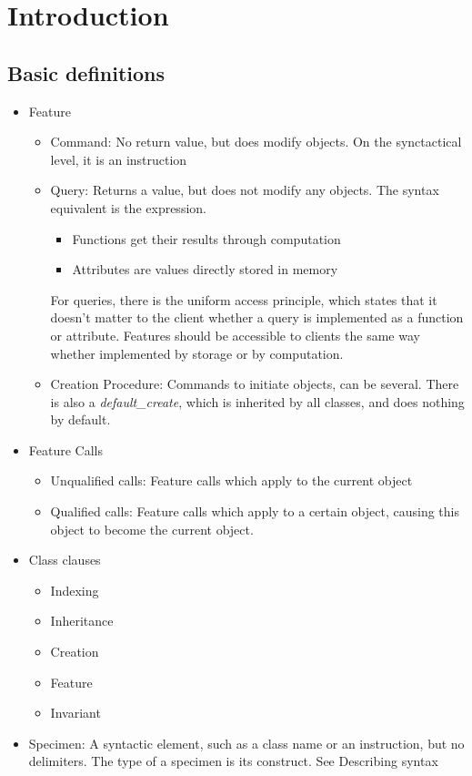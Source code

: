 \documentclass[a4paper]{article}
\begin{document}
\section{Introduction}
\subsection{Basic definitions}
\begin{itemize}
\item Feature
\begin{itemize}
\item Command: No return value, but does modify objects. On the synctactical level, it is an instruction
\item Query: Returns a value, but does not modify any objects. The syntax equivalent is the expression.
\begin{itemize}
\item Functions get their results through computation
\item Attributes are values directly stored in memory
\end{itemize}
For queries, there is the uniform access principle, which states that it doesn't matter to the client whether a query is implemented as a function or attribute. Features should be accessible to clients the same way whether implemented by storage or by computation.
\item Creation Procedure: Commands to initiate objects, can be several. There is also a \textsl{default\_create}, which is inherited by all classes, and does nothing by default. 
\end{itemize}
\item Feature Calls
\begin{itemize}
\item Unqualified calls: Feature calls which apply to the current object
\item Qualified calls: Feature calls which apply to a certain object, causing this object to become the current object. 
\end{itemize}
\item Class clauses
\begin{itemize}
\item Indexing
\item Inheritance
\item Creation
\item Feature
\item Invariant
\end{itemize}
\item Specimen: A syntactic element, such as a class name or an instruction, but no delimiters. The type of a specimen is its construct. See Describing syntax

\end{itemize}
\end{document}
